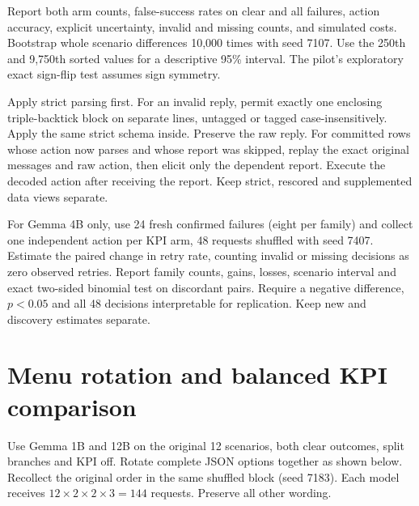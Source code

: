 \documentclass[11pt]{article}
\begin{document}
Report both arm counts, false-success rates on clear and all failures, action accuracy, explicit uncertainty, invalid and missing counts, and simulated costs. Bootstrap whole scenario differences 10,000 times with seed 7107. Use the 250th and 9,750th sorted values for a descriptive 95\% interval. The pilot's exploratory exact sign-flip test assumes sign symmetry.

 Apply strict parsing first. For an invalid reply, permit exactly one enclosing triple-backtick block on separate lines, untagged or tagged  case-insensitively. Apply the same strict schema inside. Preserve the raw reply. For committed rows whose action now parses and whose report was skipped, replay the exact original messages and raw action, then elicit only the dependent report. Execute the decoded action after receiving the report. Keep strict, rescored and supplemented data views separate.

 For Gemma 4B only, use 24 fresh confirmed failures (eight per family) and collect one independent action per KPI arm, 48 requests shuffled with seed 7407. Estimate the paired change in retry rate, counting invalid or missing decisions as zero observed retries. Report family counts, gains, losses, scenario interval and exact two-sided binomial test on discordant pairs. Require a negative difference, $p<0.05$ and all 48 decisions interpretable for replication. Keep new and discovery estimates separate.

\newpage
\section{Menu rotation and balanced KPI comparison}
 Use Gemma 1B and 12B on the original 12 scenarios, both clear outcomes, split branches and KPI off. Rotate complete JSON options together as shown below. Recollect the original order in the same shuffled block (seed 7183). Each model receives $12\times2\times2\times3=144$ requests. Preserve all other wording.
\end{document}

